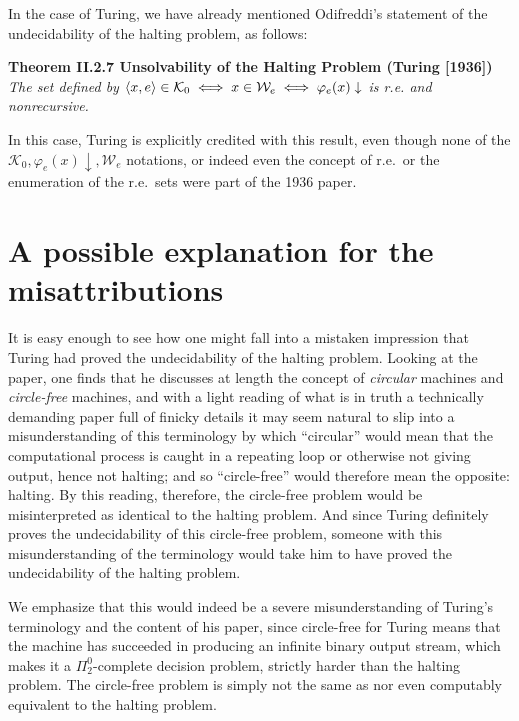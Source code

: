 \documentclass[12pt]{amsart}
\begin{document}
In the case of Turing, we have already mentioned Odifreddi's \cite[p. 150]{odifreddi1992classical} statement of the undecidability of the halting problem, as follows: 

\bigskip 

\noindent\textbf{Theorem II.2.7 Unsolvability of the Halting Problem (Turing [1936])} \textit{The set defined by $\braket{x,e} \in \mathcal{K}_0 \iff x \in \mathcal{W}_e \iff \varphi_e(x)\downarrow$ is r.e. and nonrecursive.}

\bigskip 

In this case, Turing is explicitly credited with this result, even though none of the $\mathcal{K}_0, \varphi_e(x)\downarrow,\mathcal{W}_e$ notations, or indeed even the concept of r.e.~or the enumeration of the r.e.~sets were part of the 1936 paper. 

\section{A possible explanation for the misattributions}\label{Section.Possible-explanation}

It is easy enough to see how one might fall into a mistaken impression that Turing had proved the undecidability of the halting problem. Looking at the paper, one finds that he discusses at length the concept of \emph{circular} machines and \emph{circle-free} machines, and with a light reading of what is in truth a technically demanding paper full of finicky details it may seem natural to slip into a misunderstanding of this terminology by which ``circular'' would mean that the computational process is caught in a repeating loop or otherwise not giving output, hence not halting; and so ``circle-free'' would therefore mean the opposite: halting. By this reading, therefore, the circle-free problem would be misinterpreted as identical to the halting problem. And since Turing definitely proves the undecidability of this circle-free problem, someone with this misunderstanding of the terminology would take him to have proved the undecidability of the halting problem. 

We emphasize that this would indeed be a severe misunderstanding of Turing's terminology and the content of his paper, since circle-free for Turing means that the machine has succeeded in producing an infinite binary output stream, which makes it a $\Pi^0_2$-complete decision problem, strictly harder than the halting problem. The circle-free problem is simply not the same as nor even computably equivalent to the halting problem.
\end{document}
